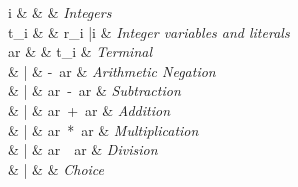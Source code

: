 \begin{syntax}
  i & \in{} &  & \textit{Integers} \\
  t_{i} & \Coloneqq{} & r_{i} \quad|\quad i & \textit{Integer variables and literals} \\
  [1.5ex]

  ar & \Coloneqq{} & t_{i}    & \textit{Terminal} \\
  & | & -\ ar       & \textit{Arithmetic Negation} \\
  & | & ar\ -\ ar       & \textit{Subtraction} \\
  & | & ar\ +\ ar     & \textit{Addition} \\
  & | & ar\ *\ ar     & \textit{Multiplication} \\
  & | & ar\ \div\ ar     & \textit{Division} \\
  & | &  & \textit{Choice} \\
\end{syntax}